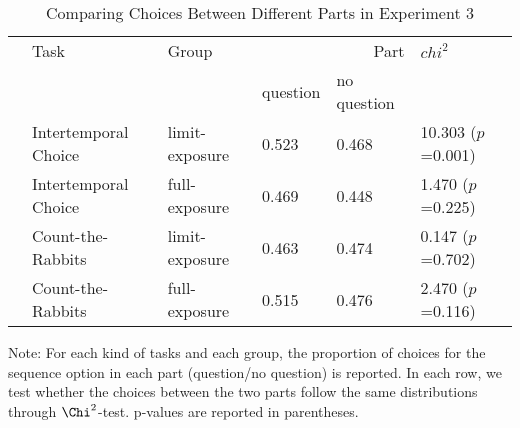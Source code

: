 \documentclass[12pt]{article}
\begin{document}
\begin{table}
    \caption{Comparing Choices Between Different Parts in Experiment 3}
    \vspace*{12pt}
    \centering

      \begin{tabular}{llllll}
\hline
 & Task & Group & \multicolumn{2}{r}{Part} & $chi^2$ \\
 &  &  & question & no question &  \\
\hline
 & Intertemporal Choice & limit-exposure & 0.523 & 0.468 & 10.303 ($p$=0.001) \\
 & Intertemporal Choice & full-exposure & 0.469 & 0.448 & 1.470 ($p$=0.225) \\
 & Count-the-Rabbits & limit-exposure & 0.463 & 0.474 & 0.147 ($p$=0.702) \\
 & Count-the-Rabbits & full-exposure & 0.515 & 0.476 & 2.470 ($p$=0.116) \\
\hline
\end{tabular}\hline


    \vspace*{4pt}
    \centering
    \begin{minipage}{0.85\textwidth}
    {\par\footnotesize Note: For each kind of tasks and each group, the proportion of choices for the sequence option in each part (question/no question) is reported. In each row, we test whether the choices between the two parts follow the same distributions through $\Chi^2$-test. p-values are reported in parentheses. }
    \end{minipage}
    \label{tab:exp3_reg_response_time}
\end{table}
\end{document}
